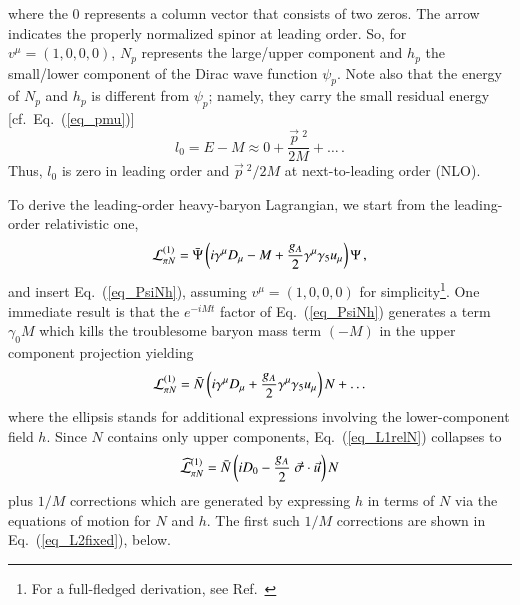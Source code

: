 \documentclass[sort&compress,preprint,3p]{elsarticle}
\begin{document}
where the $0$ represents a column vector that consists
of two zeros.
The arrow indicates the properly normalized spinor at leading order.
So, for $v^\mu=(1,0,0,0)$, 
$N_p$ represents the large/upper component
and $h_p$ the small/lower component of the 
Dirac wave function $\psi_p$.
Note also that the energy of 
$N_p$ and $h_p$ 
is different
from $\psi_p$; namely,  
they carry the small
residual energy
[cf.\ Eq.~(\ref{eq_pmu})]
\begin{equation}
l_0=E-M\approx 0 + \frac{{\vec p}~^2}{2M} + \ldots \,.
\end{equation}
Thus, $l_0$ is zero in leading order and ${\vec p}~^2/2M$ at 
next-to-leading order (NLO).

To derive the leading-order heavy-baryon Lagrangian,
we start from the leading-order relativistic one,
\begin{equation}
{\cal L}^{(1)}_{\pi N}  =  
 \bar{\Psi} \left(i\gamma^\mu {D}_\mu 
 - M
 + \frac{g_A}{2} \gamma^\mu \gamma_5 u_\mu
  \right) \Psi  
\,,
\end{equation}
and insert 
Eq.~(\ref{eq_PsiNh}),
assuming $v^\mu=(1,0,0,0)$ for simplicity\footnote{For a 
full-fledged derivation, see Ref.~\cite{Sch03}}.
One immediate result is that the $e^{-iMt}$ factor of
Eq.~(\ref{eq_PsiNh})
generates a term $\gamma_0 M$ which kills the
troublesome baryon mass term $(-M)$ in the upper component
projection yielding
\begin{equation}
{\cal L}^{(1)}_{\pi N}  =  
 \bar{N} \left(i\gamma^\mu {D}_\mu 
 + \frac{g_A}{2} \gamma^\mu \gamma_5 u_\mu
  \right) N  
 + \ldots
\label{eq_L1relN}
\end{equation}
where the ellipsis stands for additional expressions 
involving the lower-component
field $h$. Since $N$ contains only upper components, 
Eq.~(\ref{eq_L1relN})
collapses to
\begin{equation}
\widehat{\cal L}^{(1)}_{\pi N} 
 =  
\bar{N} \left(
 i {D}_0 
 - \frac{g_A}{2} \; 
\vec \sigma \cdot \vec u
\right) N  
\label{eq_L1HB}
\end{equation}
plus $1/M$ corrections which are generated by expressing $h$
in terms of $N$ via the equations of motion for $N$ and $h$. 
The first such $1/M$ corrections are shown in
Eq.~(\ref{eq_L2fixed}), below.
\end{document}
